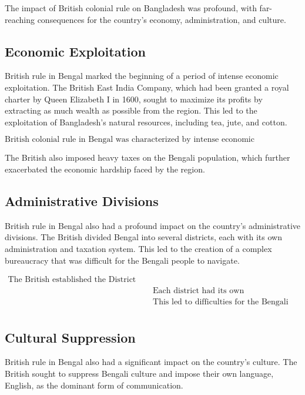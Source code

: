 
The impact of British colonial rule on Bangladesh was profound, with far-reaching consequences for the country's economy, administration, and culture.

\subsection{Economic Exploitation}
British rule in Bengal marked the beginning of a period of intense economic exploitation. The British East India Company, which had been granted a royal charter by Queen Elizabeth I in 1600, sought to maximize its profits by extracting as much wealth as possible from the region. This led to the exploitation of Bangladesh's natural resources, including tea, jute, and cotton.

\begin{equation}
\text{British colonial rule in Bengal was characterized by intense economic exploitation. The British East India Company extracted vast amounts of wealth from the region.}
\end{equation}

The British also imposed heavy taxes on the Bengali population, which further exacerbated the economic hardship faced by the region.

\subsection{Administrative Divisions}
British rule in Bengal also had a profound impact on the country's administrative divisions. The British divided Bengal into several districts, each with its own administration and taxation system. This led to the creation of a complex bureaucracy that was difficult for the Bengali people to navigate.

\begin{align}
\text{The British established the District Council System in Bengal, which created a complex bureaucracy.}\\
&\text{Each district had its own administration and taxation system.}\\
&\text{This led to difficulties for the Bengali people in understanding and navigating the bureaucratic system.}\\
\end{align}

\subsection{Cultural Suppression}
British rule in Bengal also had a significant impact on the country's culture. The British sought to suppress Bengali culture and impose their own language, English, as the dominant form of communication.

